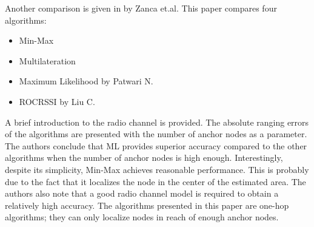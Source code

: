 Another comparison is given in \cite{zanca2008ecr} by Zanca et.al. This paper compares four algorithms: 
\begin{itemize}
	\item Min-Max \cite{langendoen2003dlw}\cite{nguyen2003las}
	\item Multilateration \cite{langendoen2003dlw}\cite{nguyen2003las}
	\item Maximum Likelihood \cite{patwari2001rlw} by Patwari N.
	\item ROCRSSI \cite{liu2004slr} by Liu C.
\end{itemize}
A brief introduction to the radio channel is provided. The absolute ranging errors of the algorithms are presented with the number of anchor nodes as a parameter. The authors conclude that ML provides superior accuracy compared to the other algorithms when the number of anchor nodes is high enough. Interestingly, despite its simplicity, Min-Max achieves reasonable performance. This is probably due to the fact that it localizes the node in the center of the estimated area. The authors also note that a good radio channel model is required to obtain a relatively high accuracy. The algorithms presented in this paper are one-hop algorithms; they can only localize nodes in reach of enough anchor nodes.